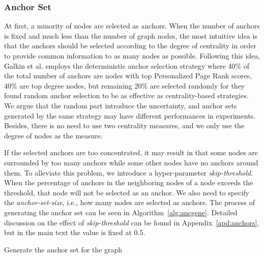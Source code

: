 \documentclass{article}
\begin{document}
\subsubsection{Anchor Set}
\label{sec:anc_set}
At first, a minority of nodes are selected as anchors. When the number of anchors is fixed and much less than the number of graph nodes, the most intuitive idea is that the anchors should be selected according to the degree of centrality in order to provide common information to as many nodes as possible.
Following this idea, Galkin et al. \cite{galkin2022nodepiece} employs the deterministic anchor selection strategy where 40\% of the total number of anchors are nodes with top Personalized Page Rank \cite{page1998the} scores, 40\% are top degree nodes, but remaining 20\% are selected randomly for they found random anchor selection to be as effective as centrality-based strategies.
We argue that the random part introduce the uncertainty, and anchor sets generated by the same strategy may have different performances in experiments. Besides, there is no need to use two centrality measures, and we only use the degree of nodes as the measure.

If the selected anchors are too concentrated, it may result in that some nodes are surrounded by too many anchors while some other nodes have no anchors around them. To alleviate this problem, we introduce a hyper-parameter \emph{skip-threshold}. When the percentage of anchors in the neighboring nodes of a node exceeds the threshold, that node will not be selected as an anchor. We also need to specify the \emph{anchor-set-size}, i.e., how many nodes are selected as anchors. The process of generating the anchor set can be seen in Algorithm~\ref{alg:ancgene}. 
Detailed discussion on the effect of \emph{skip-threshold} can be found in Appendix~\ref{apd:anchors}, but in the main text the value is fixed at 0.5.

\begin{algorithm}
\caption{Generate the anchor set for the graph}
\label{alg:ancgene}
\DontPrintSemicolon
\SetAlgoLined
{}
\;
\;
\end{algorithm}
\end{document}
